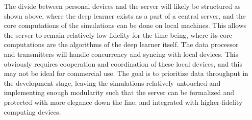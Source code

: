 \documentclass[12pt, titlepage]{article}
\begin{document}
The divide between personal devices and the server will likely be structured as shown above, where the deep learner exists as a part of a central server, and the core computations of the simulations can be done on local machines. This allows the server to remain relatively low fidelity for the time being, where its core computations are the algorithms of the deep learner itself. The data processor and transmitters will handle concurrency and syncing with local devices. This obviously requires cooperation and coordination of these local devices, and this may not be ideal for commercial use. The goal is to prioritize data throughput in the development stage, leaving the simulations relatively untouched and implementing enough modularity such that the server can be formalized and protected with more elegance down the line, and integrated with higher-fidelity computing devices.
\end{document}
